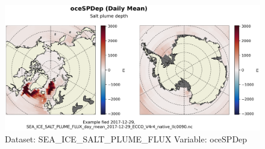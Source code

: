 \begin{figure}[H]
\centering
\includegraphics[width=\textwidth]{../images/plots/native_plots/Sea-Ice_Salt_Plume_Fluxes/oceSPDep.png}
\caption{Dataset: SEA\_ICE\_SALT\_PLUME\_FLUX Variable: oceSPDep}
\label{tab:table-SEA_ICE_SALT_PLUME_FLUX_oceSPDep-Plot}
\end{figure}
\pagebreak

